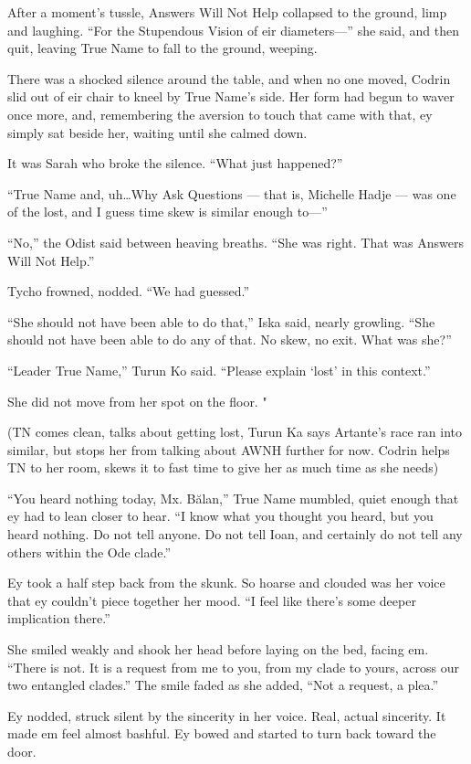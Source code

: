 After a moment's tussle, Answers Will Not Help collapsed to the ground, limp and laughing. ``For the Stupendous Vision of eir diameters—'' she said, and then quit, leaving True Name to fall to the ground, weeping.

There was a shocked silence around the table, and when no one moved, Codrin slid out of eir chair to kneel by True Name's side. Her form had begun to waver once more, and, remembering the aversion to touch that came with that, ey simply sat beside her, waiting until she calmed down.

It was Sarah who broke the silence. ``What just happened?''

``True Name and, uh\ldots Why Ask Questions — that is, Michelle Hadje — was one of the lost, and I guess time skew is similar enough to—''

``No,'' the Odist said between heaving breaths. ``She was right. That was Answers Will Not Help.''

Tycho frowned, nodded. ``We had guessed.''

``She should not have been able to do that,'' Iska said, nearly growling. ``She should not have been able to do any of that. No skew, no exit. What was she?''

``Leader True Name,'' Turun Ko said. ``Please explain `lost' in this context.''

She did not move from her spot on the floor. "

(TN comes clean, talks about getting lost, Turun Ka says Artante's race ran into similar, but stops her from talking about AWNH further for now. Codrin helps TN to her room, skews it to fast time to give her as much time as she needs)

``You heard nothing today, Mx. Bălan,'' True Name mumbled, quiet enough that ey had to lean closer to hear. ``I know what you thought you heard, but you heard nothing. Do not tell anyone. Do not tell Ioan, and certainly do not tell any others within the Ode clade.''

Ey took a half step back from the skunk. So hoarse and clouded was her voice that ey couldn't piece together her mood. ``I feel like there's some deeper implication there.''

She smiled weakly and shook her head before laying on the bed, facing em. ``There is not. It is a request from me to you, from my clade to yours, across our two entangled clades.'' The smile faded as she added, ``Not a request, a plea.''

Ey nodded, struck silent by the sincerity in her voice. Real, actual sincerity. It made em feel almost bashful. Ey bowed and started to turn back toward the door.

